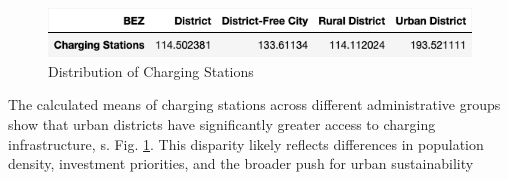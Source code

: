\begin{figure}[H]
	\begin{center}
		\includegraphics[width=\linewidth]{images/Charg_mean.png}
	\end{center}
	\caption{Distribution of Charging Stations}
	\label{fig: mean_charg}
\end{figure}
The calculated means of charging stations across different administrative groups show that urban districts have significantly greater access to charging infrastructure, s. Fig. \ref{fig: mean_charg}. This disparity likely reflects differences in population density, investment priorities, and the broader push for urban sustainability